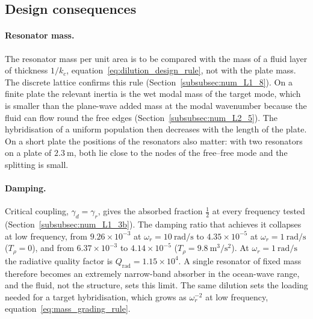 {\subsection{Design consequences}\label{subsec:disc_design}

\paragraph{Resonator mass.} The resonator mass per unit area is to be compared with the mass of a fluid layer of thickness $1/k_c$, equation~\eqref{eq:dilution_design_rule}, not with the plate mass. The discrete lattice confirms this rule (Section~\ref{subsubsec:num_L1_8}). On a finite plate the relevant inertia is the wet modal mass of the target mode, which is smaller than the plane-wave added mass at the modal wavenumber because the fluid can flow round the free edges (Section~\ref{subsubsec:num_L2_5}). The hybridisation of a uniform population then decreases with the length of the plate. On a short plate the positions of the resonators also matter: with two resonators on a plate of $2.3~\si{\meter}$, both lie close to the nodes of the free--free mode and the splitting is small.

\paragraph{Damping.} Critical coupling, $\gamma_d=\gamma_r$, gives the absorbed fraction $\tfrac12$ at every frequency tested (Section~\ref{subsubsec:num_L1_3b}). The damping ratio that achieves it collapses at low frequency, from $9.26\times10^{-3}$ at $\omega_r=10~\si{\radian\per\second}$ to $4.35\times10^{-5}$ at $\omega_r=1~\si{\radian\per\second}$ ($T_\rho=0$), and from $6.37\times10^{-3}$ to $4.14\times10^{-5}$ ($T_\rho=9.8~\si{\meter\cubed\per\second\squared}$). At $\omega_r=1~\si{\radian\per\second}$ the radiative quality factor is $Q_\mathrm{rad}=1.15\times10^4$. A single resonator of fixed mass therefore becomes an extremely narrow-band absorber in the ocean-wave range, and the fluid, not the structure, sets this limit. The same dilution sets the loading needed for a target hybridisation, which grows as $\omega_r^{-2}$ at low frequency, equation~\eqref{eq:mass_grading_rule}.

}
